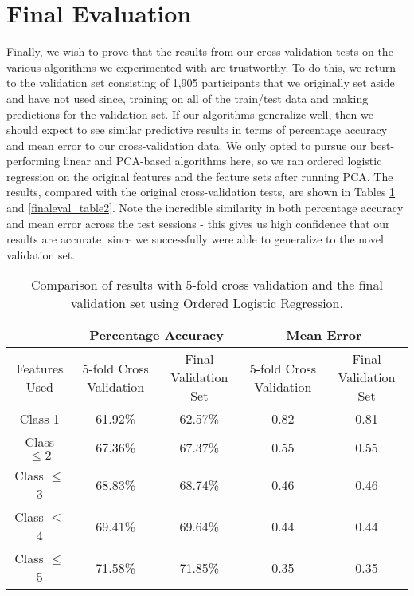 \section{Final Evaluation}
\label{sec:finaleval}

Finally, we wish to prove that the results from our cross-validation tests on the various algorithms we experimented with are trustworthy.  To do this, we return to the validation set consisting of 1,905 participants that we originally set aside and have not used since, training on all of the train/test data and making predictions for the validation set.  If our algorithms generalize well, then we should expect to see similar predictive results in terms of percentage accuracy and mean error to our cross-validation data.  We only opted to pursue our best-performing linear and PCA-based algorithms here, so we ran ordered logistic regression on the original features and the feature sets after running PCA.  The results, compared with the original cross-validation tests, are shown in Tables \ref{finaleval_table1} and \ref{finaleval_table2}.  Note the incredible similarity in both percentage accuracy and mean error across the test sessions - this gives us high confidence that our results are accurate, since we successfully were able to generalize to the novel validation set.

\begin{table}[t]
\centering
\begin{tabular}{|c|c|c|c|c|}
\hline
& \multicolumn{2}{|c|}{Percentage Accuracy} & \multicolumn{2}{|c|}{Mean Error} \\ \hline
Features Used & 5-fold Cross Validation & Final Validation Set & 5-fold Cross Validation & Final Validation Set \\ \hline
Class 1        & 61.92\% & 62.57\% & 0.82 & 0.81 \\ \hline
Class $\leq 2$ & 67.36\% & 67.37\% & 0.55 & 0.55 \\ \hline
Class $\leq$ 3 & 68.83\% & 68.74\% & 0.46 & 0.46 \\ \hline
Class $\leq$ 4 & 69.41\% & 69.64\% & 0.44 & 0.44 \\ \hline
Class $\leq$ 5 & 71.58\% & 71.85\% & 0.35 & 0.35 \\ \hline
\end{tabular}
\caption{Comparison of results with 5-fold cross validation and the final validation set using Ordered Logistic Regression.}
\label{finaleval_table1}
\end{table}

